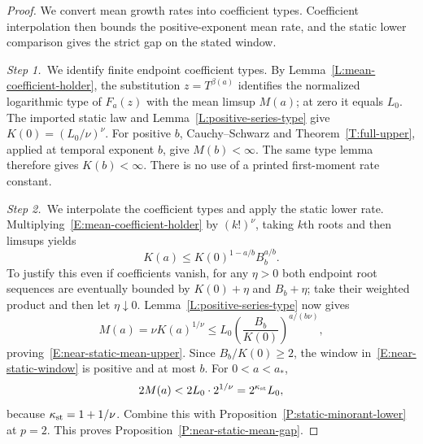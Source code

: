\documentclass[12pt,oneside,openany]{book}
\numberwithin{equation}{section}
\theoremstyle{nogostyle}
\theoremstyle{definition}
\begin{document}
\begin{proof}
  We convert mean growth rates into coefficient types. Coefficient
  interpolation then bounds the positive-exponent mean rate, and the static
  lower comparison gives the strict gap on the stated window.


  \medskip
  \noindent\textit{Step 1.~}We identify finite endpoint coefficient types.
  By Lemma~\ref{L:mean-coefficient-holder}, the substitution $z = T^{\beta(a)}$
  identifies the normalized logarithmic type of $F_a(z)$ with the mean limsup
  $M(a)$; at zero it equals $L_0$. The imported static law and
  Lemma~\ref{L:positive-series-type} give $K(0) = (L_0/\nu)^\nu$. For positive
  $b$, Cauchy--Schwarz and Theorem~\ref{T:full-upper}, applied at temporal
  exponent $b$, give $M(b) < \infty$. The same type lemma therefore gives $K(b)
  < \infty$. There is no use of a printed first-moment rate constant.


  \medskip
  \noindent\textit{Step 2.~}We interpolate the coefficient types and apply the
  static lower rate.
  Multiplying~\eqref{E:mean-coefficient-holder} by $(k!)^\nu$, taking $k$th
  roots and then limsups yields
  \[
    K(a)\le K(0)^{1-a/b}B_b^{a/b}.
  \]
  To justify this even if coefficients vanish, for any $\eta > 0$ both endpoint
  root sequences are eventually bounded by $K(0)+\eta$ and $B_b+\eta$; take
  their weighted product and then let $\eta\downarrow0$.
  Lemma~\ref{L:positive-series-type} now gives
  \[
    M(a)=\nu K(a)^{1/\nu}
    \le L_0\left(\frac{B_b}{K(0)}\right)^{a/(b\nu)},
  \]
  proving~\eqref{E:near-static-mean-upper}. Since $B_b/K(0) \ge 2$, the window
  in~\eqref{E:near-static-window} is positive and at most $b$. For $0 < a <
  a_*$,
  \[
    2M(a)<2L_0\cdot2^{1/\nu}
    =2^{\kappa_{\rm st}}L_0,
  \]
  because $\kappa_{\rm st} = 1+1/\nu$. Combine this with
  Proposition~\ref{P:static-minorant-lower} at $p = 2$. This proves
  Proposition~\ref{P:near-static-mean-gap}.
\end{proof}
\end{document}

